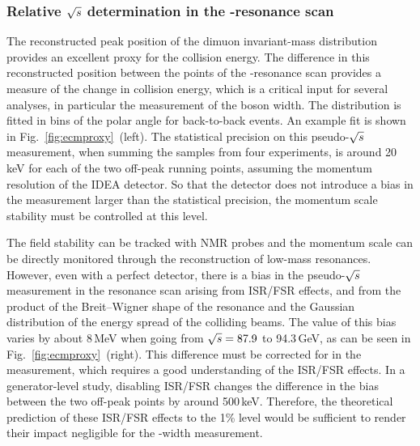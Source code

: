 \subsubsection{Relative \texorpdfstring{$\sqrt{s}$}{ECM} determination in the \texorpdfstring{\PZ}{Z}-resonance scan}

The reconstructed peak position of the dimuon invariant-mass distribution provides an excellent proxy for the collision energy. 
The difference in this reconstructed position between the points of the \PZ-resonance scan provides a measure of the change in collision energy, 
which is a critical input for several analyses, in particular the measurement of the \PZ boson width. 
The distribution is fitted in bins of the polar angle for back-to-back events.  
An example fit is shown in Fig.~\ref{fig:ecmproxy}~(left).
The statistical precision on this pseudo-$\sqrt{s}$ measurement, when summing the samples from four experiments, is around 20\,keV for each of the two off-peak running points, assuming the momentum resolution of the IDEA detector.
So that the detector does not introduce a bias in the measurement larger than the statistical precision, the momentum scale stability must be controlled at this level. 

The field stability can be tracked with NMR probes and the momentum scale can be directly monitored through the reconstruction of low-mass resonances. 
However, even with a perfect detector, there is a bias in the pseudo-$\sqrt{s}$ measurement in the \PZ resonance scan arising from ISR/FSR effects, 
and from the product of the Breit--Wigner shape of the resonance and the Gaussian distribution of the energy spread of the colliding beams. 
The value of this bias varies by about 8\,MeV when going from $\sqrt{s} = 87.9$ to 94.3\,GeV, as can be seen in Fig.~\ref{fig:ecmproxy}~(right).  
This difference must be corrected for in the measurement, which requires a good understanding of the ISR/FSR effects.   
In a generator-level study, disabling ISR/FSR changes the difference in the bias between the two off-peak points by around 500\,keV.  
Therefore, the theoretical prediction of these ISR/FSR effects to the 1\% level would be sufficient to render their impact negligible for the \PZ-width measurement. 

